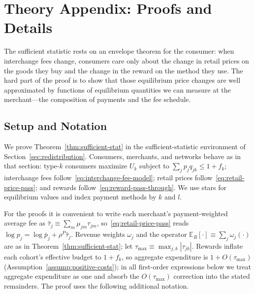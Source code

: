 \documentclass[main.tex]{subfiles}
\begin{document}
\section{Theory Appendix: Proofs and Details}\label{sec:appendix-theory}

The sufficient statistic rests on an envelope theorem for the consumer: when interchange fees change, consumers care only about the change in retail prices on the goods they buy and the change in the reward on the method they use.
The hard part of the proof is to show that those equilibrium price changes are well approximated by functions of equilibrium quantities we can measure at the merchant---the composition of payments and the fee schedule.

\subsection{Setup and Notation}\label{subsec:setup-notation}

We prove Theorem~\ref{thm:sufficient-stat} in the sufficient-statistic environment of Section~\ref{sec:redistribution}.
Consumers, merchants, and networks behave as in that section: type-$k$ consumers maximize $U_k$ subject to $\sum_j p_j q_{jk}\leq 1+f_k$; interchange fees follow~\eqref{eq:interchange-fee-model}; retail prices follow~\eqref{eq:retail-price-pass}; and rewards follow~\eqref{eq:reward-pass-through}.
We use stars for equilibrium values and index payment methods by $k$ and $l$.

For the proofs it is convenient to write each merchant's payment-weighted average fee as $\hat\tau_j\equiv\sum_m\mu_{jm}\tau_{jm}$, so~\eqref{eq:retail-price-pass} reads $\log p_j=\log\bar p_j+\rho^P\hat\tau_j$.
Revenue weights $\omega_j$ and the operator $\mathbb{E}_R[\cdot]\equiv\sum_j\omega_j(\cdot)$ are as in Theorem~\ref{thm:sufficient-stat}; let $\tau_{\max}\equiv\max_{j,k}|\tau_{jk}|$.
Rewards inflate each cohort's effective budget to $1+f_k$, so aggregate expenditure is $1+O(\tau_{\max})$ (Assumption~\ref{assump:positive-costs}); in all first-order expressions below we treat aggregate expenditure as one and absorb the $O(\tau_{\max})$ correction into the stated remainders.
The proof uses the following additional notation.
\end{document}
